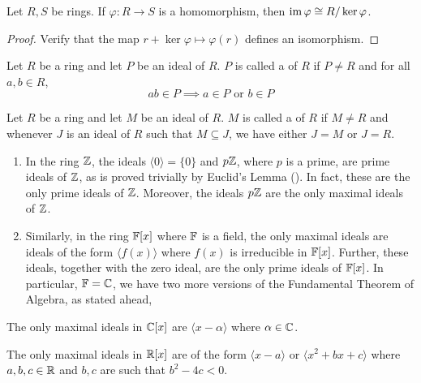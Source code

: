 \begin{theorem} \label{thm:ring-iso-1}
    Let $R,S$ be rings. If $\varphi \colon R \to S$ is a homomorphism, then $\operatorname{im}\varphi \cong R/\ker \varphi$.
\end{theorem}
\begin{proof}
Verify that the map $r + \ker\varphi \mapsto \varphi(r)$ defines an isomorphism.
\end{proof}

\begin{defn}
    Let $R$ be a ring and let $P$ be an ideal of $R$. $P$ is called a  of $R$ if $P \neq R$ and for all $a,b \in R$,
    \[
        ab \in P \implies a \in P \text{ or } b \in P
    \]
\end{defn}

\begin{defn}
    Let $R$ be a ring and let $M$ be an ideal of $R$. $M$ is called a  of $R$ if $M \neq R$ and whenever $J$ is an ideal of $R$ such that $M \subseteq J$, we have either $J = M$ or $J = R$.
\end{defn}

\begin{ex}
    \phantom{hi}
    \begin{enumerate}
        \item In the ring $\mathbb{Z}$, the ideals $\langle 0 \rangle = \{0\}$ and $p\mathbb{Z}$, where $p$ is a prime, are prime ideals of $\mathbb{Z}$, as is proved trivially by Euclid's Lemma (). In fact, these are the only prime ideals of $\mathbb{Z}$. Moreover, the ideals $p\mathbb{Z}$ are the only maximal ideals of $\mathbb{Z}$.
        
        \item Similarly, in the ring $\mathbb{F}[x]$ where $\mathbb{F}$ is a field, the only maximal ideals are ideals of the form $\langle f(x) \rangle$ where $f(x)$ is irreducible in $\mathbb{F}[x]$. Further, these ideals, together with the zero ideal, are the only prime ideals of $\mathbb{F}[x]$. In particular, $\mathbb{F} = \mathbb{C}$, we have two more versions of the Fundamental Theorem of Algebra, as stated ahead,
    \end{enumerate}
\end{ex}

\begin{theorem} \label{thm:FTA6}
    The only maximal ideals in $\mathbb{C}[x]$ are $\langle x-\alpha \rangle$ where $\alpha \in \mathbb{C}$.
\end{theorem}
\begin{theorem} \label{thm:FTA7}
    The only maximal ideals in $\mathbb{R}[x]$ are of the form $\langle x-a \rangle$ or $\langle x^2 + bx + c \rangle$ where $a,b,c \in \mathbb{R}$ and $b,c$ are such that $b^2 - 4c < 0$.
\end{theorem}

